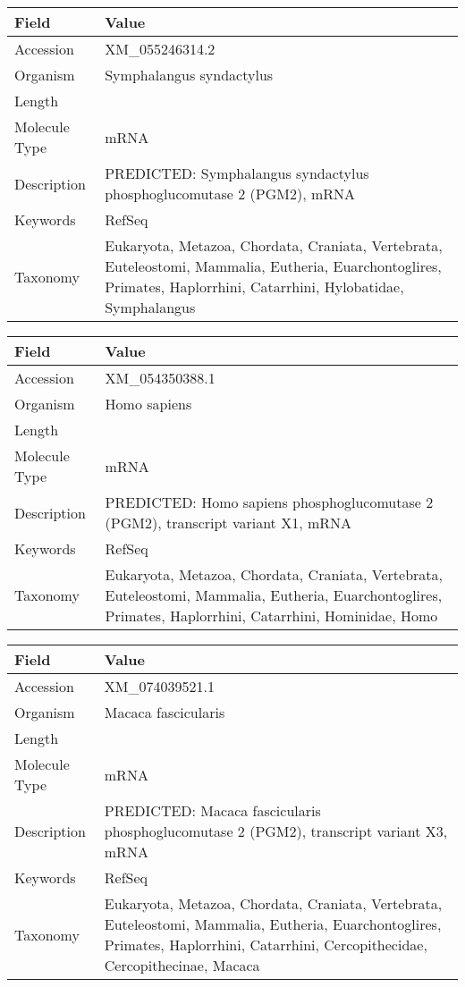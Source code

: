\documentclass[10pt]{article}
\begin{document}
{\footnotesize
\begin{longtable}{>{\raggedright\arraybackslash}p{4.5cm} >{\raggedright\arraybackslash}p{11.5cm}}
\textbf{Field} & \textbf{Value} \\
\hline
Accession & XM\_055246314.2 \\
Organism & Symphalangus syndactylus \\
Length & 2975 \\
Molecule Type & mRNA \\
Description & PREDICTED: Symphalangus syndactylus phosphoglucomutase 2 (PGM2), mRNA \\
Keywords & RefSeq \\
Taxonomy & Eukaryota, Metazoa, Chordata, Craniata, Vertebrata, Euteleostomi, Mammalia, Eutheria, Euarchontoglires, Primates, Haplorrhini, Catarrhini, Hylobatidae, Symphalangus \\
\end{longtable}
}

{\footnotesize
\begin{longtable}{>{\raggedright\arraybackslash}p{4.5cm} >{\raggedright\arraybackslash}p{11.5cm}}
\textbf{Field} & \textbf{Value} \\
\hline
Accession & XM\_054350388.1 \\
Organism & Homo sapiens \\
Length & 2834 \\
Molecule Type & mRNA \\
Description & PREDICTED: Homo sapiens phosphoglucomutase 2 (PGM2), transcript variant X1, mRNA \\
Keywords & RefSeq \\
Taxonomy & Eukaryota, Metazoa, Chordata, Craniata, Vertebrata, Euteleostomi, Mammalia, Eutheria, Euarchontoglires, Primates, Haplorrhini, Catarrhini, Hominidae, Homo \\
\end{longtable}
}

{\footnotesize
\begin{longtable}{>{\raggedright\arraybackslash}p{4.5cm} >{\raggedright\arraybackslash}p{11.5cm}}
\textbf{Field} & \textbf{Value} \\
\hline
Accession & XM\_074039521.1 \\
Organism & Macaca fascicularis \\
Length & 2274 \\
Molecule Type & mRNA \\
Description & PREDICTED: Macaca fascicularis phosphoglucomutase 2 (PGM2), transcript variant X3, mRNA \\
Keywords & RefSeq \\
Taxonomy & Eukaryota, Metazoa, Chordata, Craniata, Vertebrata, Euteleostomi, Mammalia, Eutheria, Euarchontoglires, Primates, Haplorrhini, Catarrhini, Cercopithecidae, Cercopithecinae, Macaca \\
\end{longtable}
}
\end{document}
